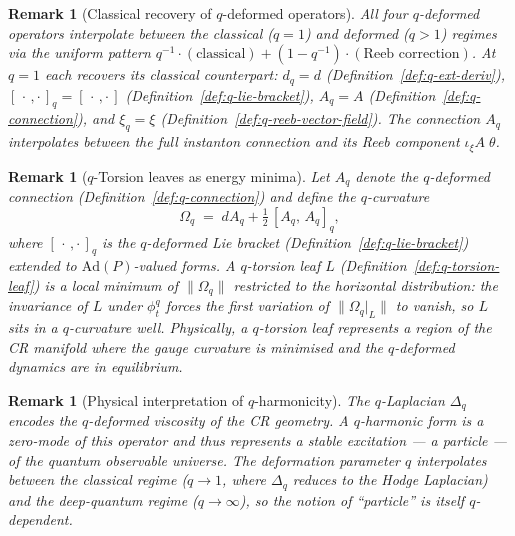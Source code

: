 \documentclass[12pt,a4paper]{report}
\newtheorem{remark}[theorem]{Remark}
\begin{document}
\begin{remark}[Classical recovery of $q$-deformed operators]
\label{rem:classical-recovery}
All four $q$-deformed operators interpolate between the classical ($q = 1$)
and deformed ($q > 1$) regimes via the uniform pattern
$q^{-1} \cdot (\text{classical}) + (1 - q^{-1}) \cdot (\text{Reeb correction})$.
At $q = 1$ each recovers its classical counterpart:
$d_q = d$ (Definition~\ref{def:q-ext-deriv}),
$[\,\cdot\,,\cdot\,]_q = [\,\cdot\,,\cdot\,]$
(Definition~\ref{def:q-lie-bracket}),
$A_q = A$ (Definition~\ref{def:q-connection}), and
$\xi_q = \xi$ (Definition~\ref{def:q-reeb-vector-field}).
The connection $A_q$ interpolates between the full instanton connection and
its Reeb component $\iota_\xi A\;\theta$.
\end{remark}

\begin{remark}[$q$-Torsion leaves as energy minima]
\label{rem:q-torsion-leaf-minimum}
Let $A_q$ denote the $q$-deformed connection
(Definition~\ref{def:q-connection}) and define the $q$-curvature
\[
  \Omega_q \;=\; dA_q + \tfrac{1}{2}\,[A_q,\, A_q]_q,
\]
where $[\,\cdot\,,\cdot\,]_q$ is the $q$-deformed Lie bracket
(Definition~\ref{def:q-lie-bracket}) extended to $\mathrm{Ad}(P)$-valued
forms.  A $q$-torsion leaf $L$ (Definition~\ref{def:q-torsion-leaf}) is a
local minimum of $\lVert\Omega_q\rVert$ restricted to the horizontal
distribution: the invariance of $L$ under $\phi_t^q$ forces the first
variation of $\lVert\Omega_q|_L\rVert$ to vanish, so $L$ sits in a
$q$-curvature well.  Physically, a $q$-torsion leaf represents a region of
the CR manifold where the gauge curvature is minimised and the $q$-deformed
dynamics are in equilibrium.
\end{remark}

\begin{remark}[Physical interpretation of $q$-harmonicity]
\label{rem:q-harmonic-physical}
The $q$-Laplacian $\Delta_q$ encodes the $q$-deformed viscosity of the
CR geometry.  A $q$-harmonic form is a zero-mode of this operator and thus
represents a stable excitation --- a particle --- of the quantum observable
universe.  The deformation parameter $q$ interpolates between the classical
regime ($q \to 1$, where $\Delta_q$ reduces to the Hodge Laplacian) and the
deep-quantum regime ($q \to \infty$), so the notion of ``particle'' is itself
$q$-dependent.
\end{remark}
\end{document}

